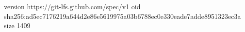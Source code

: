version https://git-lfs.github.com/spec/v1
oid sha256:ad5ec7176219a644d2e86e5619975a03b6788ec0e330eade7adde8951323ec3a
size 1409
